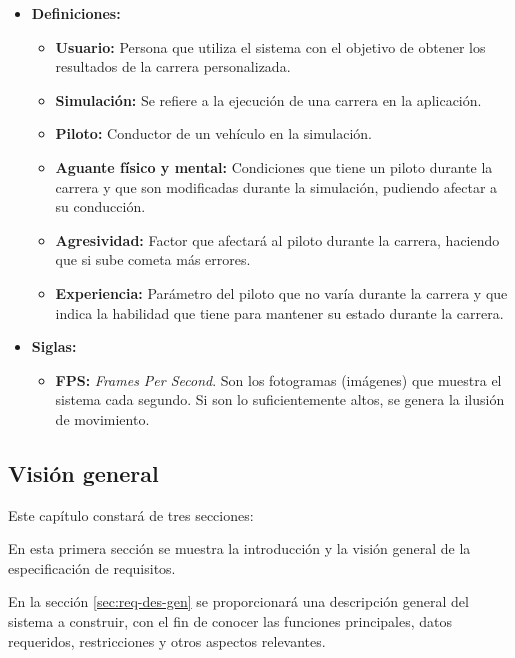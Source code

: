 \begin{itemize}
    \item \textbf{Definiciones: }
        \begin{itemize}
            \item \textbf{Usuario: }Persona que utiliza el sistema con el objetivo de obtener los resultados de la carrera personalizada.
            \item \textbf{Simulación: }Se refiere a la ejecución de una carrera en la aplicación.
            \item \textbf{Piloto: }Conductor de un vehículo en la simulación.
            \item \textbf{Aguante físico y mental: }Condiciones que tiene un piloto durante la carrera y que son modificadas durante la simulación, pudiendo afectar a su conducción.
            \item \textbf{Agresividad: }Factor que afectará al piloto durante la carrera, haciendo que si sube cometa más errores.
            \item \textbf{Experiencia: }Parámetro del piloto que no varía durante la carrera y que indica la habilidad que tiene para mantener su estado durante la carrera.
        \end{itemize}
    \item \textbf{Siglas: }
    \begin{itemize}
        \item \textbf{FPS: }\textit{Frames Per Second}. Son los fotogramas (imágenes) que muestra el sistema cada segundo. Si son lo suficientemente altos, se genera la ilusión de movimiento.
    \end{itemize}
\end{itemize}

\subsection{Visión general}
Este capítulo constará de tres secciones:

\bigskip

En esta primera sección se muestra la introducción y la visión general de la especificación de requisitos.

\bigskip

En la sección \ref{sec:req-des-gen} se proporcionará una descripción general del sistema a construir, con el fin de conocer las funciones principales, datos requeridos, restricciones y otros aspectos relevantes. 

\bigskip


